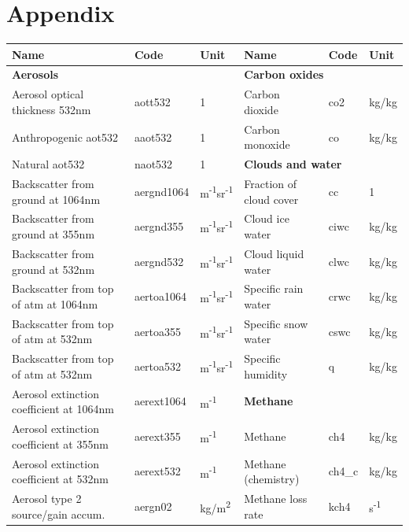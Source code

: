 \section{Appendix}
\begin{table}[htbp]
	\center
	\footnotesize
	\begin{tabular}{l | l | l | l | l | l}
	\textbf{Name} & \textbf{Code} & \textbf{Unit} & \textbf{Name} & \textbf{Code} & \textbf{Unit} \\
	\hline
	\multicolumn{3}{l}{\textbf{Aerosols}} & \multicolumn{3}{l}{\textbf{Carbon oxides}}  \\
	Aerosol optical thickness 532nm & aott532 & 1 & Carbon dioxide & co2 & kg/kg \\
	Anthropogenic aot532 & aaot532 & 1 & Carbon monoxide & co & kg/kg \\
	Natural aot532 & naot532 & 1 &  \multicolumn{3}{l}{\textbf{Clouds and water}} \\
	Backscatter from ground at 1064nm & aergnd1064 & m\textsuperscript{-1}sr\textsuperscript{-1} & Fraction of cloud cover & cc &1 \\
Backscatter from ground at 355nm & aergnd355 & m\textsuperscript{-1}sr\textsuperscript{-1} & Cloud ice water & ciwc & kg/kg \\
Backscatter from ground at 532nm & aergnd532 & m\textsuperscript{-1}sr\textsuperscript{-1} & Cloud liquid water & clwc & kg/kg \\
Backscatter from top of atm at 1064nm & aertoa1064 & m\textsuperscript{-1}sr\textsuperscript{-1} & Specific rain water & crwc & kg/kg \\
Backscatter from top of atm at 532nm & aertoa355 & m\textsuperscript{-1}sr\textsuperscript{-1} & Specific snow water & cswc & kg/kg \\
Backscatter from top of atm at 532nm  & aertoa532 & m\textsuperscript{-1}sr\textsuperscript{-1} & Specific humidity & q & kg/kg \\
Aerosol extinction coefficient at 1064nm & aerext1064 & m\textsuperscript{-1} &  \multicolumn{3}{l}{\textbf{Methane}} \\
Aerosol extinction coefficient at 355nm & aerext355 & m\textsuperscript{-1} & Methane & ch4 & kg/kg \\
Aerosol extinction coefficient at 532nm & aerext532 & m\textsuperscript{-1} & Methane (chemistry) & ch4\_c & kg/kg \\
Aerosol type 2 source/gain accum. & aergn02 & kg/m\textsuperscript{2} & Methane loss rate & kch4 & s\textsuperscript{-1} \\

\end{tabular}
\end{table}
